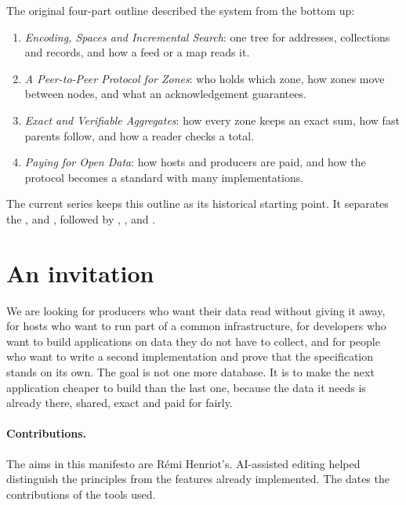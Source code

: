 \documentclass[11pt]{article}
\begin{document}
The original four-part outline described the system from the bottom up:
\begin{enumerate}[leftmargin=1.5em]
  \item \textit{Encoding, Spaces and Incremental Search}: one tree for addresses, collections and records, and how a feed or a map reads it.
  \item \textit{A Peer-to-Peer Protocol for Zones}: who holds which zone, how zones move between nodes, and what an acknowledgement guarantees.
  \item \textit{Exact and Verifiable Aggregates}: how every zone keeps an exact sum, how fast parents follow, and how a reader checks a total.
  \item \textit{Paying for Open Data}: how hosts and producers are paid, and how the protocol becomes a standard with many implementations.
\end{enumerate}

The current series keeps this outline as its historical starting point. It separates the ,  and , followed by , , and .

\section*{An invitation}
We are looking for producers who want their data read without giving it away, for hosts who want to run part of a common infrastructure, for developers who want to build applications on data they do not have to collect, and for people who want to write a second implementation and prove that the specification stands on its own. The goal is not one more database. It is to make the next application cheaper to build than the last one, because the data it needs is already there, shared, exact and paid for fairly.

\paragraph{Contributions.} The aims in this manifesto are Rémi Henriot's. AI-assisted editing helped distinguish the principles from the features already implemented. The  dates the contributions of the tools used.
\end{document}
